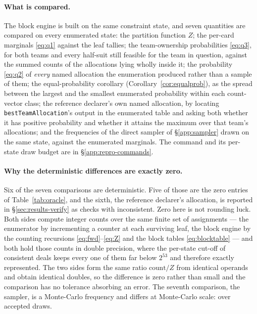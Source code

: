 \paragraph{What is compared.} The block engine is built on the same constraint
state, and seven quantities are compared on every enumerated state: the partition
function $Z$; the per-card marginals \eqref{eq:q1} against the leaf tallies; the
team-ownership probabilities \eqref{eq:q3}, for both teams and every half-suit
still feasible for the team in question, against the summed counts of the
allocations lying wholly inside it; the probability \eqref{eq:q2} of \emph{every}
named allocation the enumeration produced rather than a sample of them; the
equal-probability corollary (Corollary~\ref{cor:equalprob}), as the spread
between the largest and the smallest enumerated probability within each
count-vector class; the reference declarer's own named allocation, by locating
\texttt{bestTeamAllocation}'s output in the enumerated table and asking both
whether it has positive probability and whether it attains the maximum over that
team's allocations; and the frequencies of the direct sampler of
\S\ref{app:sampler} drawn on the same state, against the enumerated marginals.
The command and its per-state draw budget are in \S\ref{app:repro-commands}.

\paragraph{Why the deterministic differences are exactly zero.} Six of the seven
comparisons are deterministic. Five of those are the zero entries of
Table~\ref{tab:oracle}, and the sixth, the reference declarer's allocation, is
reported in \S\ref{sec:results-verify} as \numOracleBestChecks{} checks with
\numOracleBestBad{} inconsistent. Zero here is not rounding luck. Both sides
compute integer counts over the same finite set of assignments --- the enumerator
by incrementing a counter at each surviving leaf, the block engine by the
counting recursions \eqref{eq:fwd}--\eqref{eq:Z} and the block tables
\eqref{eq:blocktable} --- and both hold those counts in double precision, where
the per-state cut-off of \numOracleMaxDeals{} consistent deals keeps every one of
them far below $2^{53}$ and therefore exactly represented. The two sides form the
same ratio
$\text{count}/Z$ from identical operands and obtain identical doubles, so the
difference is zero rather than small and the comparison has no tolerance
absorbing an error. The seventh comparison, the sampler, is a Monte-Carlo
frequency and differs at Monte-Carlo scale: \numOracleSampleDiff{} over
\numOracleDraws{} accepted draws.

